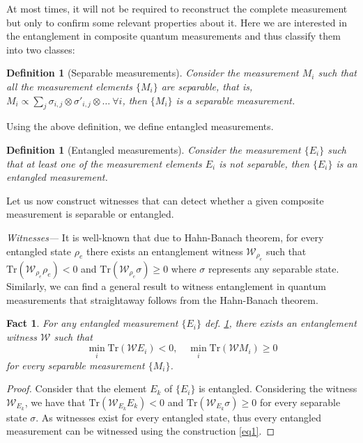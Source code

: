 \documentclass[pra,twocolumn,showpacs]{revtex4-2}
\newcommand{\Tr}[1]{\mathrm{Tr}#1}
\theoremstyle{plain}
\newtheorem{fakt}{Fact}
\newtheorem{defn}[thm]{Definition}
\theoremstyle{definition}
\theoremstyle{remark}
\begin{document}
At most times, it will not be required to reconstruct the complete measurement but only to confirm some relevant properties about it. %
Here we are interested in the entanglement in composite quantum measurements and thus classify them into two classes:

\begin{defn}[Separable measurements] \label{defsep} Consider the measurement $M_i$ such that all the measurement elements $\{M_i\}$ are separable, that is, $M_i\propto \sum_j\sigma_{i,j}\otimes\sigma'_{i,j}\otimes\ldots\ \forall i$, then  $\{M_i\}$ is a separable measurement. 
\end{defn}
Using the above definition, we define entangled measurements.
\begin{defn}[Entangled measurements] \label{defent} Consider the measurement $\{E_i\}$ such that at least one of the  measurement elements $E_i$ is not separable, then  $\{E_i\}$ is an entangled measurement. 
\end{defn}

Let us now construct witnesses that can detect whether a given composite measurement is separable or entangled.  

{\it{Witnesses---}} It is well-known that due to Hahn-Banach theorem, for every entangled state $\rho_e$ there exists an entanglement witness $\mathcal{W}_{\rho_e}$ such that $\Tr(\mathcal{W}_{\rho_e}\rho_e)<0$ and $\Tr(\mathcal{W}_{\rho_e}\sigma)\geq0$ where $\sigma$ represents any separable state. Similarly, we can find a general result to witness entanglement in quantum measurements that straightaway follows from the Hahn-Banach theorem.
\begin{fakt} For any entangled measurement $\{E_i\}$ def. \ref{defent}, there exists an entanglement witness $\mathcal{W}$ such that 
\begin{equation}\label{eq1}
   \min_i\Tr(\mathcal{W}E_i)<0,\quad \min_i\Tr(\mathcal{W}M_i)\geq0
\end{equation}
for every separable measurement $\{M_i\}$.
\end{fakt}
\begin{proof}
    Consider that the element $E_k$ of $\{E_i\}$ is entangled. Considering the witness $\mathcal{W}_{E_k}$, we have that $\Tr(\mathcal{W}_{E_k}E_k)<0$ and $\Tr(\mathcal{W}_{E_k}\sigma)\geq0$ for every separable state $\sigma$. As witnesses exist for every entangled state, thus every entangled measurement can be witnessed using the construction \eqref{eq1}.
\end{proof}
\end{document}
